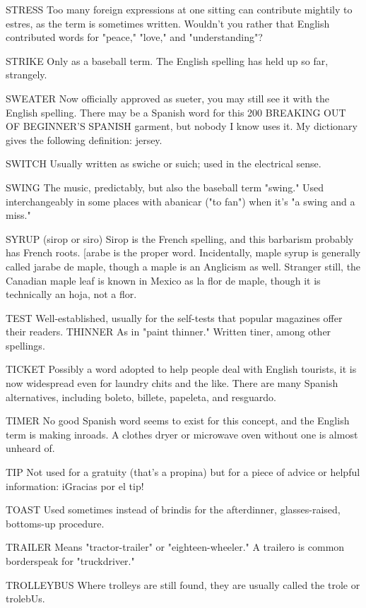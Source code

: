 STRESS Too many foreign expressions at one sitting can
contribute mightily to estres, as the term is sometimes written.
Wouldn't you rather that English contributed words for "peace,"
"love," and "understanding"?

STRIKE Only as a baseball term. The English spelling has
held up so far, strangely.

SWEATER Now officially approved as sueter, you may still
see it with the English spelling. There may be a Spanish word for this
200 BREAKING OUT OF BEGINNER'S SPANISH
garment, but nobody I know uses it. My dictionary gives the following
definition: jersey.

SWITCH Usually written as swiche or suich; used in the electrical sense.

SWING The music, predictably, but also the baseball term
"swing." Used interchangeably in some places with abanicar ("to fan")
when it's "a swing and a miss."

SYRUP (sirop or siro) Sirop is the French spelling, and this
barbarism probably has French roots. [arabe is the proper word. Incidentally, maple syrup is generally called jarabe de maple, though a
maple is an Anglicism as well. Stranger still, the Canadian maple leaf
is known in Mexico as la flor de maple, though it is technically an
hoja, not a flor.

TEST Well-established, usually for the self-tests that popular
magazines offer their readers.
THINNER As in "paint thinner." Written tiner, among other
spellings.

TICKET Possibly a word adopted to help people deal with English tourists, it is now widespread even for laundry chits and the like.
There are many Spanish alternatives, including boleto, billete, papeleta, and resguardo.

TIMER No good Spanish word seems to exist for this concept,
and the English term is making inroads. A clothes dryer or microwave
oven without one is almost unheard of.

TIP Not used for a gratuity (that's a propina) but for a piece of
advice or helpful information: iGracias por el tip!

TOAST Used sometimes instead of brindis for the afterdinner, glasses-raised, bottoms-up procedure.

TRAILER Means "tractor-trailer" or "eighteen-wheeler." A
trailero is common borderspeak for "truckdriver."

TROLLEYBUS Where trolleys are still found, they are usually
called the trole or trolebUs.

